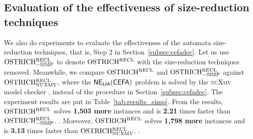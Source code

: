 \subsection{Evaluation of the effectiveness of size-reduction techniques}\label{subsec:size_reduction_eval}
We also do experiments to evaluate the effectiveness of the automata size-reduction techniques, that is, Step 2 in Section~\ref{subsec:cefadec}. 
Let us use $\rm OSTRICH^{RECL}_{\rm -SIMP}$ to denote $\rm OSTRICH^{RECL}$ with the size-reduction techniques removed. 
Meanwhile, we compare $\rm OSTRICH^{RECL}$ and $\rm OSTRICH^{RECL}_{\rm -SIMP}$ against $\rm OSTRICH^{RECL}_{\rm NUXMV}$, where the ${\sf NE_{LIA}(CEFA)}$ problem is solved by the \textsc{nuXmv} model checker \cite{nuxmv}, instead of the procedure in Section~\ref{subsec:cefadec}. 
The experiment results are put in Table~\ref{tab:results_simp}. 
From the results, $\rm OSTRICH^{RECL}$ solves \textbf{1,503 more} instances and is \textbf{2.21} times faster than $\rm OSTRICH^{RECL}_{\rm -SIMP}$. . Moreover, $\rm OSTRICH^{RECL}$ solves \textbf{1,798 more} instances and is \textbf{3.13} times faster than $\rm OSTRICH^{RECL}_{\rm NUXMV}$. .
